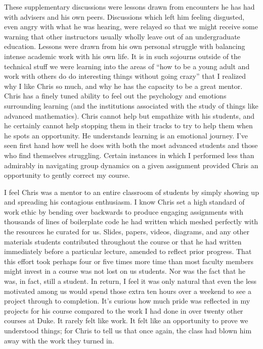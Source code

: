 \documentclass[a4paper, 11pt]{article} %
\begin{document}
These supplementary discussions were lessons drawn from encounters he has had with advisers and his own peers. Discussions which left him feeling disgusted, even angry with what he was hearing, were relayed so that we might receive some warning that other instructors usually wholly leave out of an undergraduate education. Lessons were drawn from his own personal struggle with balancing intense academic work with his own life. It is in such sojourns outside of the technical stuff we were learning into the areas of “how to be a young adult and work with others do do interesting things without going crazy” that I realized why I like Chris so much, and why he has the capacity to be a great mentor. Chris has a finely tuned ability to feel out the psychology and emotions surrounding learning (and the institutions associated with the study of things like advanced mathematics). Chris cannot help but empathize with his students, and he certainly cannot help stopping them in their tracks to try to help them when he spots an opportunity. He understands learning is an emotional journey. I've seen first hand how well he does with both the most advanced students and those who find themselves struggling. Certain instances in which I performed less than admirably in navigating group dynamics on a given assignment provided Chris an opportunity to gently correct my course. 


I feel Chris was a mentor to an entire classroom of students by simply showing up and spreading his contagious enthusiasm. I know Chris set a high standard of work ethic by bending over backwards to produce engaging assignments with thousands of lines of boilerplate code he had written which meshed perfectly with the resources he curated for us. Slides, papers, videos, diagrams, and any other materials students contributed throughout the course or that he had written immediately before a particular lecture, amended to reflect prior progress. That this effort took perhaps four or five times more time than most faculty members might invest in a course was not lost on us students. Nor was the fact that he was, in fact, still a student. In return, I feel it was only natural that even the less motivated among us would spend those extra ten hours over a weekend to see a project through to completion. It’s curious how much pride was reflected in my projects for his course compared to the work I had done in over twenty other courses at Duke. It rarely felt like work. It felt like an opportunity to prove we understood things; for Chris to tell us that once again, the class had blown him away with the work they turned in.
\end{document}
